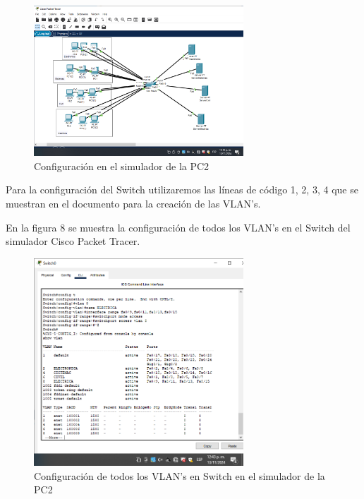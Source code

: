         \begin{figure}[H]
            \centering
            \includegraphics[width=0.7\textwidth]{img/Grafica.PNG}
            \caption{Configuración en el simulador de la PC2}
            \label{fig:Grafica}
        \end{figure}

        Para la configuración del Switch utilizaremos las líneas de código 1, 2, 3, 4 que se muestran en el documento para la creación de las VLAN's.

        En la figura 8 se muestra la configuración de todos los VLAN's en el Switch del simulador Cisco Packet Tracer.

        \begin{figure}[H]
            \centering
            \includegraphics[width=0.7\textwidth]{img/Captura.PNG}
            \caption{Configuración de todos los VLAN's en Switch en el simulador de la PC2}
            \label{fig:Captura}
        \end{figure}

